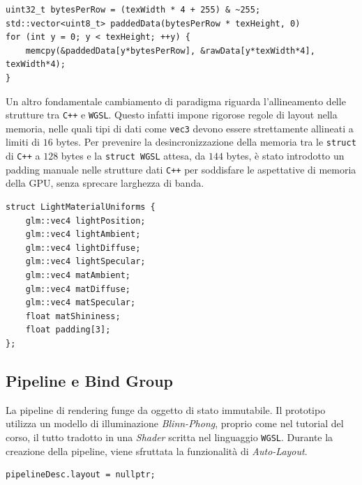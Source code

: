 \documentclass[a4paper, 11pt, twoside]{report}
\begin{document}
\begin{listing}[!ht]
\begin{verbatim}
uint32_t bytesPerRow = (texWidth * 4 + 255) & ~255;
std::vector<uint8_t> paddedData(bytesPerRow * texHeight, 0)
for (int y = 0; y < texHeight; ++y) {
    memcpy(&paddedData[y*bytesPerRow], &rawData[y*texWidth*4], texWidth*4);
}
\end{verbatim}
\vspace{-0.75cm}
\caption{Generazione dei dati texture con padding}
\label{listing:texpad}
\end{listing}

Un altro fondamentale cambiamento di paradigma riguarda l'allineamento delle strutture tra \texttt{C++} e \texttt{WGSL}.
Questo infatti impone rigorose regole di layout nella memoria, nelle quali tipi di dati come \texttt{vec3} devono essere
strettamente allineati a limiti di $16$ bytes.
Per prevenire la desincronizzazione della memoria tra le \texttt{struct} di \texttt{C++} a $128$ bytes e la
\texttt{struct WGSL} attesa, da $144$ bytes, è stato introdotto un padding manuale nelle strutture dati \texttt{C++} per
soddisfare le aspettative di memoria della GPU, senza sprecare larghezza di banda.

\begin{listing}[!ht]
\begin{verbatim}
struct LightMaterialUniforms {
    glm::vec4 lightPosition;
    glm::vec4 lightAmbient;
    glm::vec4 lightDiffuse;
    glm::vec4 lightSpecular;
    glm::vec4 matAmbient;
    glm::vec4 matDiffuse;
    glm::vec4 matSpecular;
    float matShininess;
    float padding[3];
};
\end{verbatim}
\vspace{-0.75cm}
\caption{Esempio di allineamento a $16$ bytes}
\label{listing:wgslpad}
\end{listing}

\subsection{Pipeline e Bind Group}

La pipeline di rendering funge da oggetto di stato immutabile. Il prototipo utilizza un modello di illuminazione
\textit{Blinn-Phong}, proprio come nel tutorial del corso, il tutto tradotto in una \textit{Shader} scritta nel
linguaggio \texttt{WGSL}. Durante la creazione della pipeline, viene sfruttata la funzionalità di \textit{Auto-Layout}.

\begin{verbatim}
pipelineDesc.layout = nullptr;
\end{verbatim}
\end{document}
